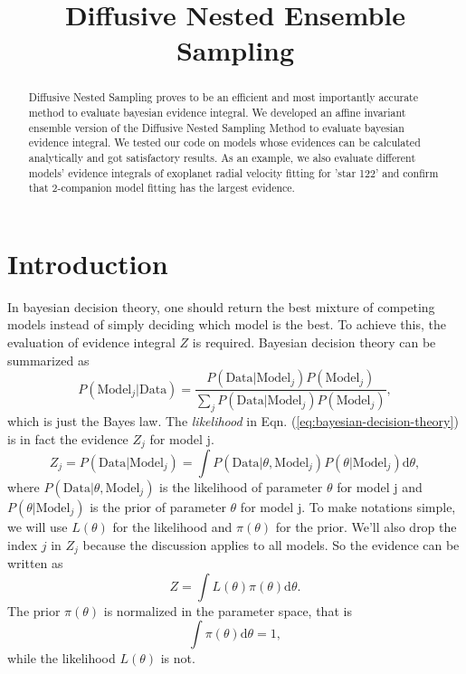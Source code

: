 \documentclass[letterpaper, preprint]{aastex}
\begin{document}
\title{
  Diffusive Nested Ensemble Sampling
}

\begin{abstract}
Diffusive Nested Sampling proves to be an efficient and most importantly accurate method to evaluate bayesian evidence integral. We developed an affine invariant ensemble version of the Diffusive Nested Sampling Method to evaluate bayesian evidence integral. We tested our code on models whose evidences can be calculated analytically and got satisfactory results. As an example, we also evaluate different models' evidence integrals of exoplanet radial velocity fitting for 'star 122' and confirm that 2-companion model fitting has the largest evidence.

\end{abstract}


\section{Introduction}

In bayesian decision theory, one should return the best mixture of competing models instead of simply deciding which model is the best. To achieve this, the evaluation of evidence integral $Z$ is required. Bayesian decision theory can be summarized as
\begin{equation}
P(\mathrm{Model}_j|\mathrm{Data})=\frac{P(\mathrm{Data}|\mathrm{Model}_j)P(\mathrm{Model}_j)}{\sum_j{P(\mathrm{Data}|\mathrm{Model}_j)P(\mathrm{Model}_j)}},
\label{eq:bayesian-decision-theory}
\end{equation}
which is just the Bayes law. The \textit{likelihood} in Eqn. (\ref{eq:bayesian-decision-theory}) is in fact the evidence $Z_j$ for model j.
\begin{equation}
Z_j=P(\mathrm{Data}|\mathrm{Model}_j)=\int P(\mathrm{Data}|\theta, \mathrm{Model}_j) P(\theta|\mathrm{Model}_j)\mathrm{d}\theta,
\end{equation}
where $P(\mathrm{Data}|\theta, \mathrm{Model}_j)$ is the likelihood of parameter $\theta$ for model j and $P(\theta|\mathrm{Model}_j)$ is the prior of parameter $\theta$ for model j. To make notations simple, we will use $L(\theta)$ for the likelihood and $\pi(\theta)$ for the prior. We'll also drop the index $j$ in $Z_j$ because the discussion applies to all models. So the evidence can be written as
\begin{equation}
Z=\int\! L(\theta)\pi(\theta)\mathrm{d}\theta.
\end{equation}
The prior $\pi(\theta)$ is normalized in the parameter space, that is
\begin{equation}
\int\!\pi(\theta)\mathrm{d}\theta=1,
\end{equation}
while the likelihood $L(\theta)$ is not.
\end{document}
